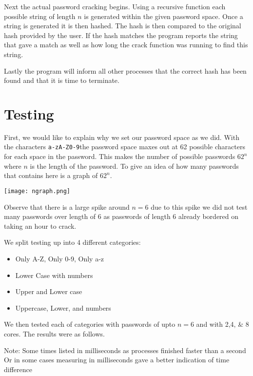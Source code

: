 \documentclass[11pt]{article}
\begin{document}
Next the actual password cracking begins. Using a recursive function each possible string of length $n$ is generated within the given password space. Once a string is generated it is then hashed. The hash is then compared to the original hash provided by the user. If the hash matches the program reports the string that gave a match as well as how long the crack function was running to find this string. 

Lastly the program will inform all other processes that the correct hash has been found and that it is time to terminate. 

\section{Testing}
First, we would like to explain why we set our password space as we did. With the characters \verb|a-zA-Z0-9|the password space maxes out at 62 possible characters for each space in the password. This makes the number of possible passwords $62^n$ where $n$ is the length of the password. To give an idea of how many passwords that contains here is a graph of $62^n$. 

\begin{center}
	\texttt{[image: ngraph.png]}
\end{center}

Observe that there is a large spike around $n=6$ due to this spike we did not test many passwords over length of 6 as passwords of length 6 already bordered on taking an hour to crack. 

We split testing up into 4 different categories:
\begin{itemize}
	\item Only A-Z, Only 0-9, Only a-z
	\item Lower Case with numbers
	\item Upper and Lower case
	\item Uppercase, Lower, and numbers
\end{itemize}

We then tested each of categories with passwords of upto $n=6$ and with 2,4, \& 8 cores. The results were as follows.

Note: Some times listed in milliseconds as processes finished faster than a second Or in some cases measuring in milliseconds gave a better indication of time difference 
\end{document}
